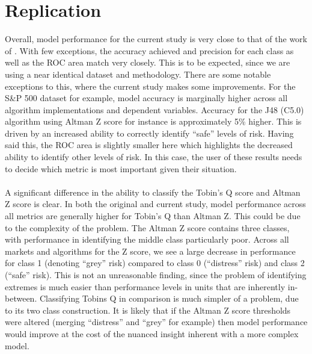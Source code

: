 \section{Replication}\label{S.Discussion.replication}
Overall, model performance for the current study is very close to that of the work of \cite{moldovan2015learning}. With few exceptions, the accuracy achieved and precision for each class as well as the ROC area match very closely. This is to be expected, since we are using a near identical dataset and methodology. There are some notable exceptions to this, where the current study makes some improvements. For the S\&P 500 dataset for example, model accuracy is marginally higher across all algorithm implementations and dependent variables. Accuracy for the J48 (C5.0) algorithm using Altman Z score for instance is approximately 5\% higher. This is driven by an increased ability to correctly identify ``safe'' levels of risk. Having said this, the ROC area is slightly smaller here which highlights the decreased ability to identify other levels of risk. In this case, the user of these results needs to decide which metric is most important given their situation. \\\\
A significant difference in the ability to classify the Tobin's Q score and Altman Z score is clear. In both the original and current study, model performance across all metrics are generally higher for Tobin's Q than Altman Z. This could be due to the complexity of the problem. The Altman Z score contains three classes, with performance in identifying the middle class particularly poor. Across all markets and algorithms for the Z score, we see a large decrease in performance for class 1 (denoting ``grey'' risk) compared to class 0 (``distress'' risk) and class 2 (``safe'' risk). This is not an unreasonable finding, since the problem of identifying extremes is much easier than performance levels in units that are inherently in-between. Classifying Tobins Q in comparison is much simpler of a problem, due to its two class construction. It is likely that if the Altman Z score thresholds were altered (merging ``distress'' and ``grey'' for example) then model performance would improve at the cost of the nuanced insight inherent with a more complex model.\\\\
